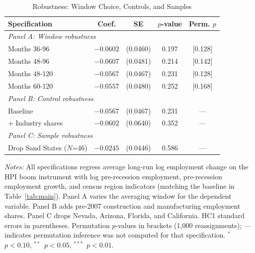 \begin{table}[H]
\centering
\caption{Robustness: Window Choice, Controls, and Samples}
\begin{threeparttable}
\small
\begin{tabular}{lcccc}
\toprule
Specification & Coef. & SE & $p$-value & Perm. $p$ \\
\midrule
\multicolumn{5}{l}{\textit{Panel A: Window robustness}} \\[3pt]
Months 36-96 & $-0.0602$ & (0.0460) & 0.197 & [0.128] \\
Months 48-96 & $-0.0607$ & (0.0481) & 0.214 & [0.142] \\
Months 48-120 & $-0.0567$ & (0.0467) & 0.231 & [0.128] \\
Months 60-120 & $-0.0557$ & (0.0480) & 0.252 & [0.168] \\
\midrule
\multicolumn{5}{l}{\textit{Panel B: Control robustness}} \\[3pt]
Baseline & $-0.0567$ & (0.0467) & 0.231 & --- \\
+ Industry shares & $-0.0602$ & (0.0640) & 0.352 & --- \\
\midrule
\multicolumn{5}{l}{\textit{Panel C: Sample robustness}} \\[3pt]
Drop Sand States ($N$=46) & $-0.0245$ & (0.0446) & 0.586 & --- \\
\bottomrule
\end{tabular}
\begin{tablenotes}[flushleft]
\small
\item \textit{Notes:} All specifications regress average long-run log employment change on the HPI boom instrument with log pre-recession employment, pre-recession employment growth, and census region indicators (matching the baseline in Table~\ref{tab:main}). Panel A varies the averaging window for the dependent variable. Panel B adds pre-2007 construction and manufacturing employment shares. Panel C drops Nevada, Arizona, Florida, and California. HC1 standard errors in parentheses. Permutation $p$-values in brackets (1,000 reassignments); --- indicates permutation inference was not computed for that specification. $^{*}$~$p<0.10$, $^{**}$~$p<0.05$, $^{***}$~$p<0.01$.
\end{tablenotes}
\end{threeparttable}
\label{tab:robustness}
\end{table}
